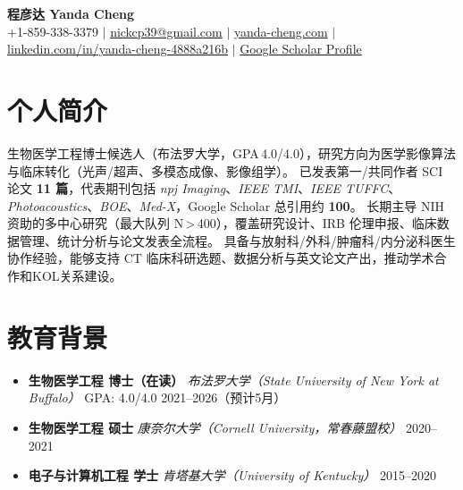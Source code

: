 \documentclass[letterpaper,10pt]{article}
\begin{document}



\begin{center}
  {\huge \textbf{程彦达 \quad Yanda Cheng}} \\
  \vspace{4pt}
  \small
  +1-859-338-3379 \quad$|$\quad
  \href{mailto:nickcp39@gmail.com}{nickcp39@gmail.com} \quad$|$\quad
  \href{https://yanda-cheng.com}{yanda-cheng.com} \quad$|$\quad
  \href{https://www.linkedin.com/in/yanda-cheng-4888a216b}{linkedin.com/in/yanda-cheng-4888a216b} \quad$|$\quad
  \href{https://scholar.google.com/citations?view_op=search_authors&mauthors=Yanda+Cheng+University+at+Buffalo}{Google Scholar Profile}
\end{center}

\vspace{-2pt}

\section{个人简介}

生物医学工程博士候选人（布法罗大学，GPA\,4.0/4.0），研究方向为医学影像算法与临床转化（光声/超声、多模态成像、影像组学）。
已发表第一/共同作者 SCI 论文 \textbf{11 篇}，代表期刊包括 \textit{npj Imaging}、\textit{IEEE TMI}、\textit{IEEE TUFFC}、\textit{Photoacoustics}、\textit{BOE}、\textit{Med-X}，Google Scholar 总引用约 \textbf{100}。
长期主导 NIH 资助的多中心研究（最大队列 N\,>\,400），覆盖研究设计、IRB 伦理申报、临床数据管理、统计分析与论文发表全流程。
具备与放射科/外科/肿瘤科/内分泌科医生协作经验，能够支持 CT 临床科研选题、数据分析与英文论文产出，推动学术合作和KOL关系建设。

\vspace{-2pt}

\section{教育背景}

\begin{itemize}[leftmargin=0.0in, label={}, itemsep=3pt, topsep=2pt]
  \item
    \textbf{生物医学工程 博士（在读）}\hfill
    \textit{布法罗大学（State University of New York at Buffalo）}\hfill
    GPA: 4.0/4.0 \hfill 2021--2026（预计5月）
  \item
    \textbf{生物医学工程 硕士}\hfill
    \textit{康奈尔大学（Cornell University，常春藤盟校）}\hfill
    2020--2021
  \item
    \textbf{电子与计算机工程 学士}\hfill
    \textit{肯塔基大学（University of Kentucky）}\hfill
    2015--2020
\end{itemize}
\end{document}
